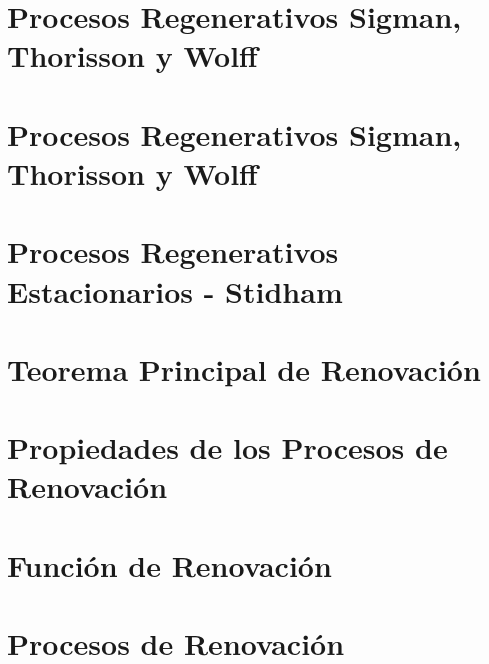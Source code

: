 \documentclass{article}
\begin{document}
\section{Procesos Regenerativos Sigman, Thorisson y Wolff \cite{Sigman1}}


\section{Procesos Regenerativos Sigman, Thorisson y Wolff \cite{Sigman2}}

\section{Procesos Regenerativos Estacionarios - Stidham \cite{Stidham}}

\section{Teorema Principal de Renovaci\'on}
%

\section{Propiedades de los Procesos de Renovaci\'on}
%

\section{Funci\'on de Renovaci\'on}


\section{Procesos de Renovaci\'on}
\end{document}
